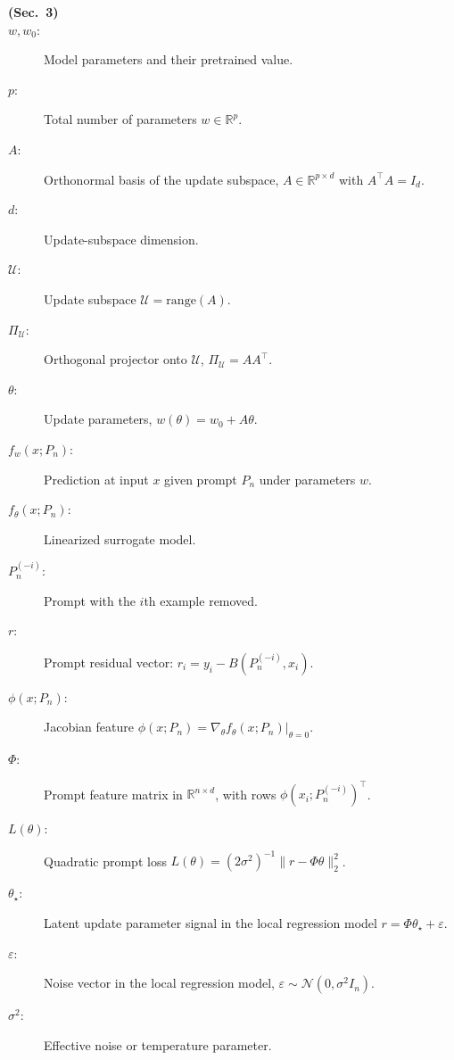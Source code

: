 \documentclass{article}
\theoremstyle{plain}
\theoremstyle{definition}
\theoremstyle{remark}
\begin{document}
\begin{description}
\item[\textbf{(Sec.~3)}]
\item[$w,w_0$:] Model parameters and their pretrained value.
\item[$p$:] Total number of parameters $w\in\mathbb R^p$.
\item[$A$:] Orthonormal basis of the update subspace,
$A\in\mathbb R^{p\times d}$ with $A^\top A=I_d$.
\item[$d$:] Update-subspace dimension.
\item[$\mathcal U$:] Update subspace $\mathcal U=\mathrm{range}(A)$.
\item[$\Pi_{\mathcal U}$:] Orthogonal projector onto $\mathcal U$, $\Pi_{\mathcal U}=AA^\top$.
\item[$\theta$:] Update parameters, $w(\theta)=w_0+A\theta$.
\item[$f_w(x;P_n)$:] Prediction at input $x$ given prompt $P_n$ under parameters $w$.
\item[$f_\theta(x;P_n)$:] Linearized surrogate model.

\item[$P_n^{(-i)}$:] Prompt with the $i$th example removed.
\item[$r$:] Prompt residual vector: $r_i=y_i-B(P_n^{(-i)},x_i)$.
\item[$\phi(x;P_n)$:] Jacobian feature $\phi(x;P_n)=\nabla_\theta f_\theta(x;P_n)\vert_{\theta=0}$.
\item[$\Phi$:] Prompt feature matrix in $\mathbb R^{n\times d}$, with rows $\phi(x_i;P_n^{(-i)})^\top$.
\item[$L(\theta)$:] Quadratic prompt loss $L(\theta)=(2\sigma^2)^{-1}\|r-\Phi\theta\|_2^2$.
\item[$\theta_\star$:] Latent update parameter signal in the local regression model
$r=\Phi\theta_\star+\varepsilon$.
\item[$\varepsilon$:] Noise vector in the local regression model,
$\varepsilon\sim\mathcal N(0,\sigma^2 I_n)$.
\item[$\sigma^2$:] Effective noise or temperature parameter.


\end{description}
\end{document}
